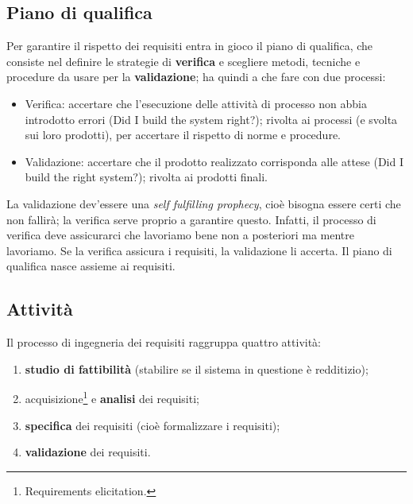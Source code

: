 \documentclass[a4paper]{article}
\begin{document}
		
	\subsection{Piano di qualifica}

		
Per garantire il rispetto dei requisiti entra in gioco il piano di qualifica, che consiste nel definire le strategie di \textbf{verifica} e scegliere metodi, tecniche e procedure da usare per la \textbf{validazione}; ha quindi a che fare con due processi:
		
	\begin{itemize}
		
			
	\item Verifica: accertare che l'esecuzione delle attività di processo non abbia introdotto errori (Did I build the system right?); rivolta ai processi (e svolta sui loro prodotti), per accertare il rispetto di norme e procedure.
			
	\item Validazione: accertare che il prodotto realizzato corrisponda alle attese (Did I build the right system?); rivolta ai prodotti finali.
		
	\end{itemize}

		
La validazione dev'essere una \emph{self fulfilling prophecy}, cioè bisogna essere certi che non fallirà; la verifica serve proprio a garantire questo. Infatti, il processo di verifica deve assicurarci che lavoriamo bene non a posteriori ma mentre lavoriamo. Se la verifica assicura i requisiti, la validazione li accerta. Il piano di qualifica nasce assieme ai requisiti.

		
	\subsection{Attività}

		
Il processo di ingegneria dei requisiti raggruppa quattro attività:
		
	\begin{enumerate}
		
			
	\item \textbf{studio di fattibilità} (stabilire se il sistema in questione è redditizio);
			
	\item acquisizione\footnote{Requirements elicitation.} e \textbf{analisi} dei requisiti;
			
	\item \textbf{specifica} dei requisiti (cioè formalizzare i requisiti);
			
	\item \textbf{validazione} dei requisiti.
		
	\end{enumerate}
\end{document}
